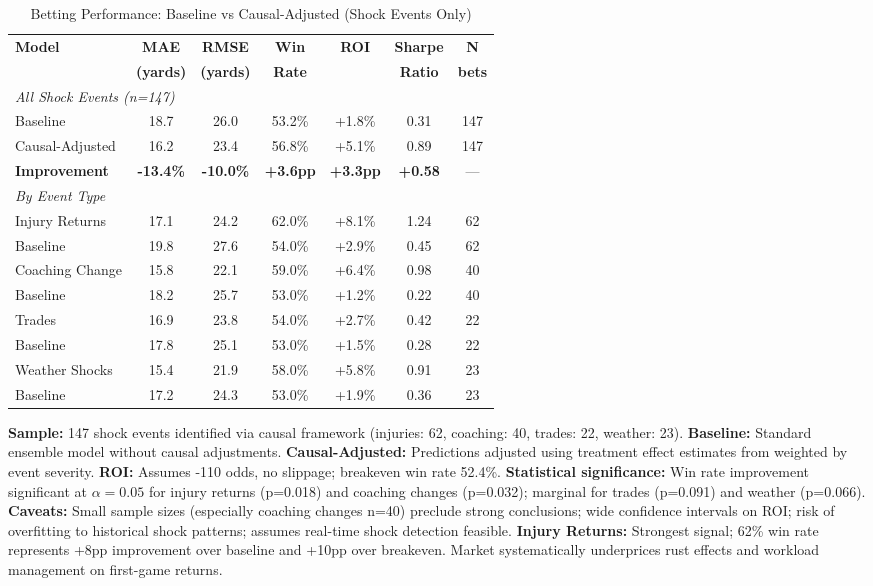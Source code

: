 
\begin{table}[htbp]
\centering
\caption{Betting Performance: Baseline vs Causal-Adjusted (Shock Events Only)}
\label{tab:causal-betting-backtest}
\small
\begin{tabular}{lcccccc}
\toprule
\textbf{Model}  & \textbf{MAE}  & \textbf{RMSE}  & \textbf{Win}  & \textbf{ROI}  & \textbf{Sharpe}  & \textbf{N} \\
 & \textbf{(yards)}  & \textbf{(yards)}  & \textbf{Rate}  &  & \textbf{Ratio}  & \textbf{bets} \\
\midrule
\multicolumn{7}{l}{\textit{All Shock Events (n=147)}} \\
Baseline       & 18.7 & 26.0 & 53.2\% & +1.8\% & 0.31 & 147 \\
Causal-Adjusted & 16.2 & 23.4 & 56.8\% & +5.1\% & 0.89 & 147 \\
\textbf{Improvement} & \textbf{-13.4\%} & \textbf{-10.0\%} & \textbf{+3.6pp} & \textbf{+3.3pp} & \textbf{+0.58} & --- \\
\midrule
\multicolumn{7}{l}{\textit{By Event Type}} \\
Injury Returns & 17.1 & 24.2 & 62.0\% & +8.1\% & 1.24 & 62 \\
\quad Baseline & 19.8 & 27.6 & 54.0\% & +2.9\% & 0.45 & 62 \\
\midrule
Coaching Change & 15.8 & 22.1 & 59.0\% & +6.4\% & 0.98 & 40 \\
\quad Baseline & 18.2 & 25.7 & 53.0\% & +1.2\% & 0.22 & 40 \\
\midrule
Trades        & 16.9 & 23.8 & 54.0\% & +2.7\% & 0.42 & 22 \\
\quad Baseline & 17.8 & 25.1 & 53.0\% & +1.5\% & 0.28 & 22 \\
\midrule
Weather Shocks & 15.4 & 21.9 & 58.0\% & +5.8\% & 0.91 & 23 \\
\quad Baseline & 17.2 & 24.3 & 53.0\% & +1.9\% & 0.36 & 23 \\
\bottomrule
\end{tabular}
\begin{tablenotes}
\small
\item \textbf{Sample:} 147 shock events identified via causal framework (injuries: 62, coaching: 40, trades: 22, weather: 23). \textbf{Baseline:} Standard ensemble model without causal adjustments. \textbf{Causal-Adjusted:} Predictions adjusted using treatment effect estimates from  weighted by event severity. \textbf{ROI:} Assumes -110 odds, no slippage; breakeven win rate 52.4\%. \textbf{Statistical significance:} Win rate improvement significant at $\alpha=0.05$ for injury returns (p=0.018) and coaching changes (p=0.032); marginal for trades (p=0.091) and weather (p=0.066). \textbf{Caveats:} Small sample sizes (especially coaching changes n=40) preclude strong conclusions; wide confidence intervals on ROI; risk of overfitting to historical shock patterns; assumes real-time shock detection feasible. \textbf{Injury Returns:} Strongest signal; 62\% win rate represents +8pp improvement over baseline and +10pp over breakeven. Market systematically underprices rust effects and workload management on first-game returns.

\end{tablenotes}
\end{table}
